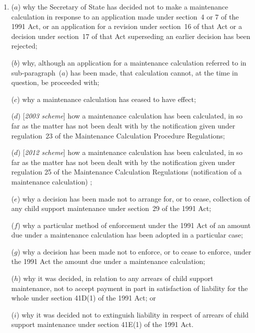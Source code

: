\documentclass[12pt,a4paper]{article}
\begin{document}
\begin{enumerate}\item[]
($a$) why 
the Secretary of State  %
has decided not to make a maintenance calculation in response to an application made under section~4 or 7 of the 1991 Act, or an application for a revision under section~16 of that Act or a decision under section~17 of that Act superseding an earlier decision has been rejected;

($b$) why, although an application for a maintenance calculation referred to in sub-paragraph~($a$)  has been made, that calculation cannot, at the time in question, be proceeded with;

($c$) why a maintenance calculation has ceased to have effect;

($d$) [\emph{2003 scheme}] how a maintenance calculation has been calculated, in so far as the matter has not been dealt with by the notification given under regulation~23 of the Maintenance Calculation Procedure Regulations;

($d$) [\emph{2012 scheme}] how a maintenance calculation has been calculated, in so far as the matter has not been dealt with by the notification given under 
regulation 25 of the Maintenance Calculation Regulations (notification of a maintenance calculation)%
;

($e$) why a decision has been made not to arrange for, or to cease, collection of any child support maintenance under section~29 of the 1991 Act;

($f$) why a particular method of enforcement under the 1991 Act of an amount due under a maintenance calculation has been adopted in a particular case; 

($g$) why a decision has been made not to enforce, or to cease to enforce, under the 1991 Act the amount due under a maintenance calculation;

($h$) why it was decided, in relation to any arrears of child support maintenance, not to accept payment in part in satisfaction of liability for the whole under section 41D(1) of the 1991 Act; or

($i$) why it was decided not to extinguish liability in respect of arrears of child support maintenance under section 41E(1) of the 1991 Act.
\end{enumerate}
\end{document}
